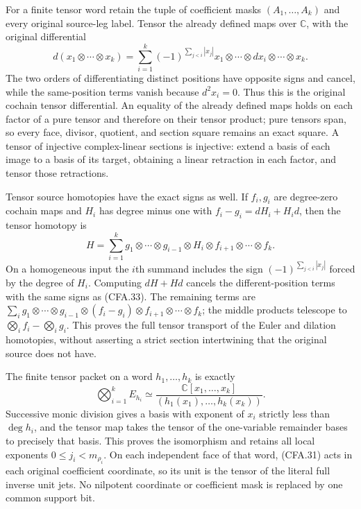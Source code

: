 For a finite tensor word retain the tuple of coefficient masks
$(A_1,\ldots,A_k)$ and every original source-leg label.  Tensor the
already defined maps over $\mathbb C$, with the original differential
\[
 d(x_1\otimes\cdots\otimes x_k)
 =\sum_{i=1}^k(-1)^{\sum_{j<i}|x_j|}
       x_1\otimes\cdots\otimes dx_i\otimes\cdots\otimes x_k.
                                                               \tag{CFA.33}
\]
The two orders of differentiating distinct positions have opposite
signs and cancel, while the same-position terms vanish because
$d^2x_i=0$.  Thus this is the original cochain tensor differential.
An equality of the already defined maps holds on each factor of a
pure tensor and therefore on their tensor product; pure tensors span,
so every face, divisor, quotient, and section square remains an exact
square.  A tensor of injective complex-linear sections is injective:
extend a basis of each image to a basis of its target, obtaining a
linear retraction in each factor, and tensor those retractions.

Tensor source homotopies have the exact signs as well.  If $f_i,g_i$
are degree-zero cochain maps and $H_i$ has degree minus one with
$f_i-g_i=dH_i+H_id$, then the tensor homotopy is
\[
 H=\sum_{i=1}^k
       g_1\otimes\cdots\otimes g_{i-1}\otimes H_i
            \otimes f_{i+1}\otimes\cdots\otimes f_k.         \tag{CFA.34}
\]
On a homogeneous input the $i$th summand includes the sign
$(-1)^{\sum_{j<i}|x_j|}$ forced by the degree of $H_i$.
Computing $dH+Hd$ cancels the different-position terms with the
same signs as (CFA.33).  The remaining terms are
$\sum_i g_1\otimes\cdots\otimes g_{i-1}\otimes(f_i-g_i)
\otimes f_{i+1}\otimes\cdots\otimes f_k$; the middle products
telescope to $\bigotimes_i f_i-\bigotimes_i g_i$.
This proves the full tensor transport of the Euler and dilation
homotopies, without asserting a strict section intertwining that
the original source does not have.

The finite tensor packet on a word $h_1,\ldots,h_k$ is exactly
\[
 \bigotimes_{i=1}^k E_{h_i}
 \simeq\frac{\mathbb C[x_1,\ldots,x_k]}
              {(h_1(x_1),\ldots,h_k(x_k))}.                   \tag{CFA.35}
\]
Successive monic division gives a basis with exponent of $x_i$
strictly less than $\deg h_i$, and the tensor map takes the tensor
of the one-variable remainder bases to precisely that basis.
This proves the isomorphism and retains all local exponents
$0\le j_i<m_{\rho_i}$.  On each independent face of that word,
(CFA.31) acts in each original coefficient coordinate, so its unit
is the tensor of the literal full inverse unit jets.  No nilpotent
coordinate or coefficient mask is replaced by one common support bit.

